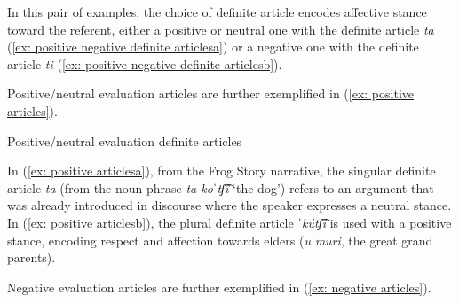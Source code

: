 In this pair of examples, the choice of definite article encodes affective stance toward the referent, either a positive or neutral one with the definite article \textit{ta} (\ref{ex: positive negative definite articlesa}) or a negative one with the definite article \textit{ti} (\ref{ex: positive negative definite articlesb}).

Positive/neutral evaluation articles are further exemplified in (\ref{ex: positive articles}).

\ea\label{ex: positive articles}
{Positive/neutral evaluation definite articles}

    \label{ex: positive articlesa}
        \label{ex: positive articlesb}
    \z
\z

In (\ref{ex: positive articlesa}), from the Frog Story narrative, the singular definite article \textit{ta} (from the noun phrase \textit{ta koˈtʃ͡î} `the dog') refers to an argument that was already introduced in discourse where the speaker expresses a neutral stance. In (\ref{ex: positive articlesb}), the plural definite article \textit{ˈkútʃ͡i} is used with a positive stance, encoding respect and affection towards elders (\textit{uˈmuri}, the great grand parents).

Negative evaluation articles are further exemplified in (\ref{ex: negative articles}).

